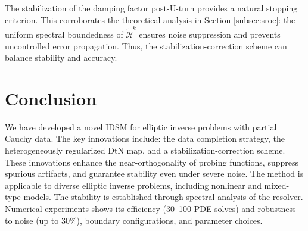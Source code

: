 \documentclass[onefignum,onetabnum]{siamart190516}
\numberwithin{equation}{section}
\begin{document}
The stabilization of the damping factor post-U-turn provides a natural stopping criterion.
This corroborates the theoretical analysis in Section \ref{subsec:sroc}: the uniform spectral boundedness of $\widetilde{\mathcal{R}}^{k}$ ensures noise suppression and prevents uncontrolled error propagation.
Thus, the stabilization-correction scheme can balance  stability and accuracy.

\section{Conclusion}\label{sec:CON}

We have developed a novel IDSM for elliptic inverse problems with partial Cauchy data.
The key innovations include: the data completion strategy, the heterogeneously regularized DtN map, and a stabilization-correction scheme. These innovations enhance the near-orthogonality of probing functions, suppress spurious artifacts, and guarantee stability even under severe noise.
The method is applicable to diverse elliptic inverse problems, including nonlinear and mixed-type models. The stability is established through spectral analysis of the resolver. Numerical experiments shows its efficiency (30–100 PDE solves) and robustness to noise (up to 30\%), boundary configurations, and parameter choices.


\end{document}
